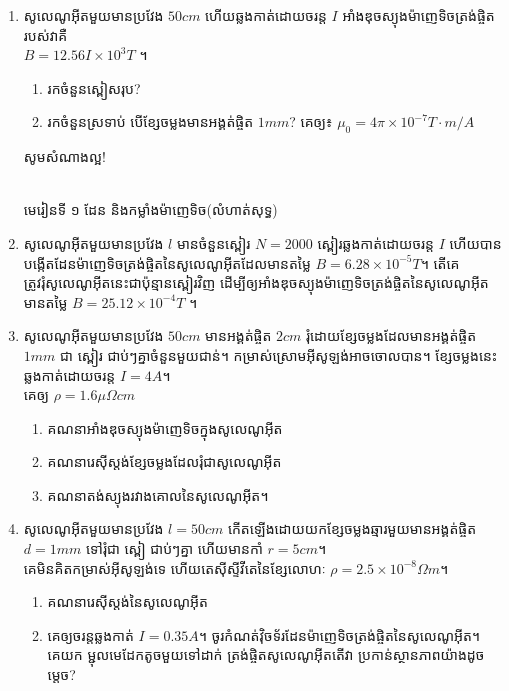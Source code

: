 \documentclass[12pt, a4paper]{article}
\begin{document}
\begin{enumerate}[m]
	\item សូលេណូអ៊ីតមួយមានប្រវែង $50cm$ ហើយឆ្លងកាត់ដោយចរន្ត $I$ អាំងឌុចស្យុងម៉ាញេទិចត្រង់ផ្ចិតរបស់វាគឺ \\$B=12.56I\times10^{3}T$ ។
	\begin{enumerate}[k]
		\item រកចំនួនស្ពៀសរុប?
		\item រកចំនួនស្រទាប់ បើខ្សែចម្លងមានអង្គត់ផ្ចិត $1mm$? គេឲ្យ៖ $\mu_0=4\pi\times10^{-7}T\cdot m/A$
	\end{enumerate}
	\begin{center}
		\sffamily\color{black}
		សូមសំណាងល្អ!
	\end{center}\newpage
	\begin{center}
		\sffamily\color{black}
		\\
		មេរៀនទី​ ១ ដែន និងកម្លាំងម៉ាញេទិច(លំហាត់សុទ្ធ)
	\end{center}
	\item សូលេណូអុីតមួយមានប្រវែង $l$ មានចំនួនស្ពៀរ $N=2000$ ស្ពៀរឆ្លងកាត់ដោយចរន្ត $I$ ហើយបានបង្កើតដែនម៉ាញេទិចត្រង់ផ្ចិតនៃសូលេណូអុីតដែលមានតម្លៃ $B=6.28\times 10^{-5}T$។ តើគេត្រូវរុំសូលេណូអុីតនេះជាប៉ុន្មានស្ពៀរវិញ ដើម្បីឲ្យអាំងឌុចស្យុងម៉ាញេទិចត្រង់ផ្ចិតនៃសូលេណូអុីតមានតម្លៃ $B=25.12\times 10^{-4}T$ ។
	\item សូលេណូអុីតមួយមានប្រវែង $50cm$ មានអង្គត់ផ្ចិត $2cm$ រុំដោយខ្សែចម្លងដែលមានអង្គត់ផ្ចិត $1mm$ ជា ស្ពៀរ​ ជាប់ៗគ្នាចំនួនមួយជាន់។ កម្រាស់ស្រោមអុីសូឡង់អាចចោលបាន។ ខ្សែចម្លងនេះឆ្លងកាត់ដោយចរន្ត $I=4A$។\\
	គេឲ្យ $\rho=1.6\mu\Omega cm$
	\begin{enumerate}[k]
		\item គណនាអាំងឌុចស្យុងម៉ាញេទិចក្នុងសូលេណូអុីត
		\item គណនារេសុីស្តង់ខ្សែចម្លងដែលរុំជាសូលេណូអុីត
		\item គណនាតង់ស្យុងរវាងគោលនៃសូលេណូអុីត។
	\end{enumerate}
	\item សូលេណូអុីតមួយមានប្រវែង $l=50cm$ កើតឡើងដោយយកខ្សែចម្លងឆ្មារមួយមានអង្គត់ផ្ចិត $d=1mm$ ទៅរុំជា ស្ពៀ ជាប់ៗគ្នា ហើយមានកាំ $r=5cm$។\\ គេមិនគិតកម្រាស់អុីសូឡង់ទេ ហើយតេសុីស្ទីវីតេនៃខ្សែលោហៈ $\rho=2.5\times10^{-8}\Omega m$។
	\begin{enumerate}[k]
		\item គណនារេសុីស្តង់នៃសូលេណូអុីត
		\item គេឲ្យចរន្តឆ្លងកាត់ $I=0.35A$។ ចូរកំណត់វុិចទ័រដែនម៉ាញេទិចត្រង់ផ្ចិតនៃសូលេណូអុីត។ \\
		គេយក ម្ជុលមេដែកតូចមួយទៅដាក់ ត្រង់ផ្ចិតសូលេណូអុីតតើវា ប្រកាន់ស្ថានភាពយ៉ាងដូចម្តេច?\\

\end{enumerate}
\end{enumerate}
\end{document}
